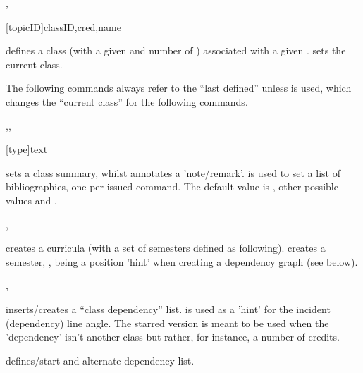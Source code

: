 \documentclass[article,nogeometry,english,tocdepth=3,secdepth=3]{ufrgscca} %
\begin{document}
\begin{codedescribe}[code,update=2023/11/18]{\classdef,\classset}
    \begin{codesyntax}%
        \tsmacro{\classdef}[topicID]{classID,cred,name}
    \end{codesyntax}
\tsmacro{\classdef}{} defines a class  (with a given  and number of ) associated  with a given . \tsmacro{\classset}{} sets the current class.

The following commands always refer to the “last defined” \tsmacro{\classdef}{} unless \tsmacro{\setclass}{} is used, which changes the “current class” for the following commands.
\end{codedescribe}

\begin{codedescribe}[code,new=2023/11/18]{\csummary,\classremark,\bibdef}
    \begin{codesyntax}%
        \tsmacro{\bibdef}[type]{text}
    \end{codesyntax}
    \tsobj{\csummary} sets a class summary, whilst \tsobj{\classremark} annotates a 'note/remark'. \tsobj{\bibdef}
 is used to set a list of bibliographies, one per issued command. The default  value is  , other possible values   and .
\end{codedescribe}



\begin{codedescribe}[code,update=2023/11/18]{\currdef,\semdef}
    \begin{codesyntax}%
    \end{codesyntax}
\tsobj{\currdef}  creates a curricula (with a set of semesters defined as following).
\tsobj{\semdef} creates a semester, ,  being a position 'hint' when creating a dependency graph (see below).
\end{codedescribe}


\begin{codedescribe}[code,update=2023/11/18]{\depdef,\altdep}
    \begin{codesyntax}%
        \tsobj[code]{\depdef}\tsverb[oarg]{*}
        \tsmacro{\altdep}{}
    \end{codesyntax}
\tsmacro{\depdef}{} inserts/creates a “class dependency” list.  is used as a 'hint' for the incident (dependency) line angle. The starred version is meant to be used when the 'dependency' isn't another class but rather, for instance, a number of credits.

\tsmacro{\altdep}{} defines/start and alternate dependency list.
\end{codedescribe}
\end{document}
